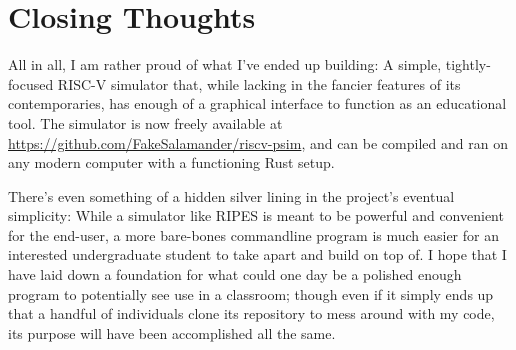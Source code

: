 \documentclass[12pt,twoside]{reedthesis}
\begin{document}
\section{Closing Thoughts}

All in all, I am rather proud of what I've ended up building: A simple, tightly-focused RISC-V simulator that, while lacking in the fancier features of its contemporaries, has enough of a graphical interface to function as an educational tool.
The simulator is now freely available at \href{https://github.com/FakeSalamander/riscv-psim}{https://github.com/FakeSalamander/riscv-psim}, and can be compiled and ran on any modern computer with a functioning Rust setup.

There's even something of a hidden silver lining in the project's eventual simplicity: While a simulator like RIPES is meant to be powerful and convenient for the end-user, a more bare-bones commandline program is much easier for an interested undergraduate student to take apart and build on top of. I hope that I have laid down a foundation for what could one day be a polished enough program to potentially see use in a classroom; though even if it simply ends up that a handful of individuals clone its repository to mess around with my code, its purpose will have been accomplished all the same.
\end{document}
